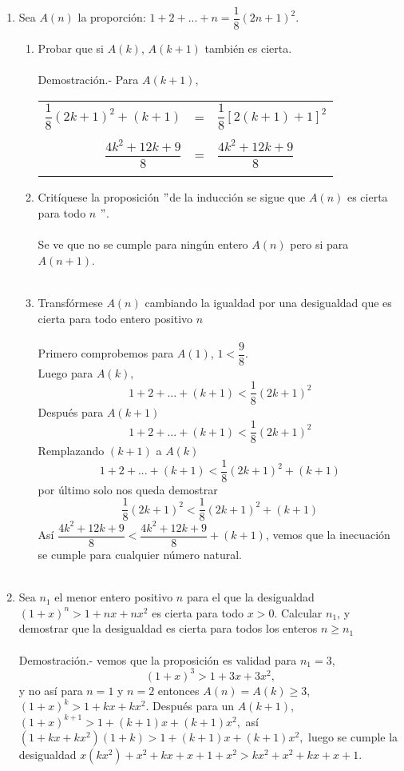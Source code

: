 \begin{enumerate}
\item Sea $A(n)$ la proporción: $1+2+...+n=\dfrac{1}{8} (2n+1)^2$.
\begin{enumerate}[\bfseries a)]
\item Probar que si $A(k)$, $A(k+1)$ también es cierta.\\\\
Demostración.- \; Para $A(k+1)$, 
\begin{center}
\begin{tabular}{r c l}
$\dfrac{1}{8}(2k+1)^2+(k+1)$&=&$\dfrac{1}{8}\left[2(k+1)+1\right]^2$\\\\
$\dfrac{4k^2+12k+9}{8}$&=&$\dfrac{4k^2+12k+9}{8}$\\\\
\end{tabular}
\end{center}
\item Critíquese la proposición $"$de la inducción se sigue que $A(n)$ es cierta para todo $n$ $"$.\\\\
Se ve que no se cumple para ningún entero $A(n)$ pero si para $A(n+1)$.\\\\ 
\item Transfórmese $A(n)$ cambiando la igualdad por una desigualdad que es cierta para todo entero positivo $n$\\\\
Primero comprobemos para $A(1)$, \; $1<\dfrac{9}{8}$.\\
Luego para $A(k),$ $$1+2+...+(k+1)<\dfrac{1}{8}(2k+1)^2$$
Después para $A(k+1)$ $$1+2+...+(k+1)<\dfrac{1}{8}(2k+1)^2$$
Remplazando $(k+1)$ a $A(k)$ $$1+2+...+(k+1)<\dfrac{1}{8}(2k+1)^2+(k+1)$$
por último solo nos queda demostrar $$\dfrac{1}{8}(2k+1)^2<\dfrac{1}{8}(2k+1)^2+(k+1)$$
Así $\dfrac{4k^2+12k+9}{8}<\dfrac{4k^2+12k+9}{8} +(k+1)$, vemos que la inecuación se cumple para cualquier número natural.\\\\ 
\end{enumerate} 

\item Sea $n_1$ el menor entero positivo $n$ para el que la desigualdad $(1+x)^n>1+nx+nx^2$ es cierta para todo $x>0$. Calcular $n_1$, y demostrar que la desigualdad es cierta para todos los enteros $n\geq n_1$\\\\
Demostración.- \; vemos que la proposición es validad para $n_1=3$, $$(1+x)^3>1+3x+3x^2,$$ y no así para $n=1$ \; y \;$n=2$ entonces $A(n)=A(k)\geq 3$, $(1+x)^k>1+kx+kx^2.$ Después para un $A(k+1)$, $(1+x)^{k+1}>1+(k+1)x+(k+1)x^2,$ así \; $(1+kx+kx^2)(1+k)>1+(k+1)x+(k+1)x^2,$ luego se cumple la desigualdad $x(kx^2)+x^2+kx+x+1+x^2>kx^2+x^2+kx+x+1$.\\\\


\end{enumerate}

